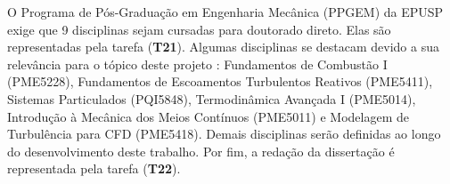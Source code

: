 O Programa de Pós-Graduação em Engenharia Mecânica (PPGEM) da EPUSP exige que 9 disciplinas sejam cursadas para doutorado direto.
Elas são representadas pela tarefa (\textbf{T21}).
Algumas disciplinas se destacam devido a sua relevância para o tópico deste projeto : Fundamentos de Combustão I (PME5228), Fundamentos de Escoamentos Turbulentos Reativos  (PME5411), Sistemas Particulados (PQI5848), Termodinâmica Avançada I (PME5014), Introdução à Mecânica dos Meios Contínuos (PME5011) e Modelagem de Turbulência para CFD (PME5418).
Demais disciplinas serão definidas ao longo do desenvolvimento deste trabalho.
Por fim, a redação da dissertação é representada pela tarefa (\textbf{T22}).




